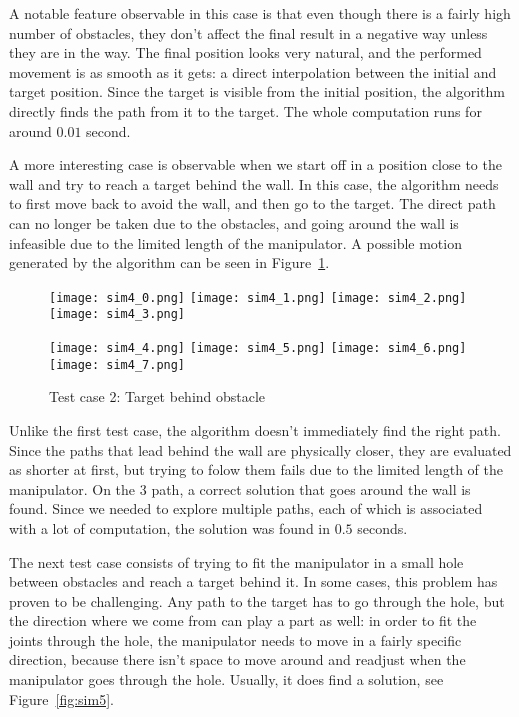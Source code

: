 A notable feature observable in this case is that even though there is a fairly high number of obstacles, they don't affect the final result in a negative way unless they are in the way. The final position looks very natural, and the performed movement is as smooth as it gets: a direct interpolation between the initial and target position. Since the target is visible from the initial position, the algorithm directly finds the path from it to the target. The whole computation runs for around $0.01$ second.

A more interesting case is observable when we start off in a position close to the wall and try to reach a target behind the wall. In this case, the algorithm needs to first move back to avoid the wall, and then go to the target. The direct path can no longer be taken due to the obstacles, and going around the wall is infeasible due to the limited length of the manipulator. A possible motion generated by the algorithm can be seen in Figure~\ref{fig:sim4}.

\begin{figure}[ht]
  \centering
  \begin{minipage}{\textwidth}
    \texttt{[image: sim4\_0.png]}
    \texttt{[image: sim4\_1.png]}
    \texttt{[image: sim4\_2.png]}
    \texttt{[image: sim4\_3.png]}

    \texttt{[image: sim4\_4.png]}
    \texttt{[image: sim4\_5.png]}
    \texttt{[image: sim4\_6.png]}
    \texttt{[image: sim4\_7.png]}
  \end{minipage}
  \caption{Test case 2: Target behind obstacle}\label{fig:sim4}
\end{figure}

Unlike the first test case, the algorithm doesn't immediately find the right path. Since the paths that lead behind the wall are physically closer, they are evaluated as shorter at first, but trying to folow them fails due to the limited length of the manipulator. On the 3\rd{} path, a correct solution that goes around the wall is found. Since we needed to explore multiple paths, each of which is associated with a lot of computation, the solution was found in $0.5$ seconds.

The next test case consists of trying to fit the manipulator in a small hole between obstacles and reach a target behind it. In some cases, this problem has proven to be challenging.
Any path to the target has to go through the hole, but the direction where we come from can play a part as well: in order to fit the joints through the hole, the manipulator needs to move in a fairly specific direction, because there isn't space to move around and readjust when the manipulator goes through the hole. Usually, it does find a solution, see Figure~\ref{fig:sim5}.


